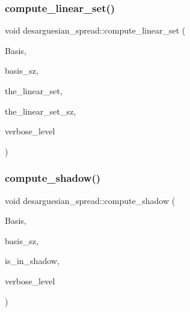 \subsubsection{\texorpdfstring{compute\+\_\+linear\+\_\+set()}{compute\_linear\_set()}}
{\footnotesize\ttfamily void desarguesian\+\_\+spread\+::compute\+\_\+linear\+\_\+set (\begin{DoxyParamCaption}\item[{\mbox{\hyperlink{galois_8h_a09fddde158a3a20bd2dcadb609de11dc}{I\+NT}} $\ast$}]{Basis,  }\item[{\mbox{\hyperlink{galois_8h_a09fddde158a3a20bd2dcadb609de11dc}{I\+NT}}}]{basis\+\_\+sz,  }\item[{\mbox{\hyperlink{galois_8h_a09fddde158a3a20bd2dcadb609de11dc}{I\+NT}} $\ast$\&}]{the\+\_\+linear\+\_\+set,  }\item[{\mbox{\hyperlink{galois_8h_a09fddde158a3a20bd2dcadb609de11dc}{I\+NT}} \&}]{the\+\_\+linear\+\_\+set\+\_\+sz,  }\item[{\mbox{\hyperlink{galois_8h_a09fddde158a3a20bd2dcadb609de11dc}{I\+NT}}}]{verbose\+\_\+level }\end{DoxyParamCaption})}

\mbox{\label{classdesarguesian__spread_a2f95efc0417bea1d34a009bf675f2bf2}} 
\subsubsection{\texorpdfstring{compute\+\_\+shadow()}{compute\_shadow()}}
{\footnotesize\ttfamily void desarguesian\+\_\+spread\+::compute\+\_\+shadow (\begin{DoxyParamCaption}\item[{\mbox{\hyperlink{galois_8h_a09fddde158a3a20bd2dcadb609de11dc}{I\+NT}} $\ast$}]{Basis,  }\item[{\mbox{\hyperlink{galois_8h_a09fddde158a3a20bd2dcadb609de11dc}{I\+NT}}}]{basis\+\_\+sz,  }\item[{\mbox{\hyperlink{galois_8h_a09fddde158a3a20bd2dcadb609de11dc}{I\+NT}} $\ast$}]{is\+\_\+in\+\_\+shadow,  }\item[{\mbox{\hyperlink{galois_8h_a09fddde158a3a20bd2dcadb609de11dc}{I\+NT}}}]{verbose\+\_\+level }\end{DoxyParamCaption})}

